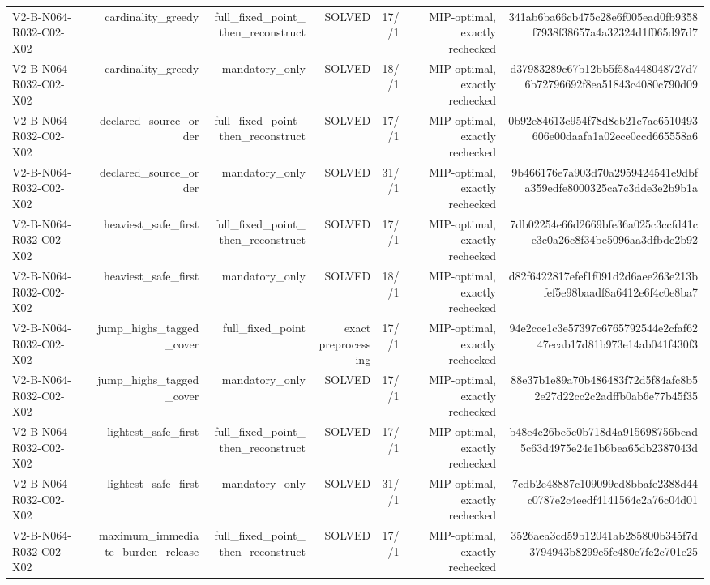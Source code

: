 {\begin{longtable}{lrrrrrr}
V2-B-N064-R032-C02-X02 & cardinality\_greedy & full\_fixed\_point\_then\_reconstruct & SOLVED & 17//1 & MIP-optimal, exactly rechecked & 341ab6ba66cb475c28e6f005ead0fb9358f7938f38657a4a32324d1f065d97d7 \\
V2-B-N064-R032-C02-X02 & cardinality\_greedy & mandatory\_only & SOLVED & 18//1 & MIP-optimal, exactly rechecked & d37983289c67b12bb5f58a448048727d76b72796692f8ea51843c4080c790d09 \\
V2-B-N064-R032-C02-X02 & declared\_source\_order & full\_fixed\_point\_then\_reconstruct & SOLVED & 17//1 & MIP-optimal, exactly rechecked & 0b92e84613c954f78d8cb21c7ae6510493606e00daafa1a02ece0ccd665558a6 \\
V2-B-N064-R032-C02-X02 & declared\_source\_order & mandatory\_only & SOLVED & 31//1 & MIP-optimal, exactly rechecked & 9b466176e7a903d70a2959424541e9dbfa359edfe8000325ca7c3dde3e2b9b1a \\
V2-B-N064-R032-C02-X02 & heaviest\_safe\_first & full\_fixed\_point\_then\_reconstruct & SOLVED & 17//1 & MIP-optimal, exactly rechecked & 7db02254e66d2669bfe36a025c3ccfd41ce3c0a26c8f34be5096aa3dfbde2b92 \\
V2-B-N064-R032-C02-X02 & heaviest\_safe\_first & mandatory\_only & SOLVED & 18//1 & MIP-optimal, exactly rechecked & d82f6422817efef1f091d2d6aee263e213bfef5e98baadf8a6412e6f4c0e8ba7 \\
V2-B-N064-R032-C02-X02 & jump\_highs\_tagged\_cover & full\_fixed\_point & exact preprocessing & 17//1 & MIP-optimal, exactly rechecked & 94e2cce1c3e57397c6765792544e2cfaf6247ecab17d81b973e14ab041f430f3 \\
V2-B-N064-R032-C02-X02 & jump\_highs\_tagged\_cover & mandatory\_only & SOLVED & 17//1 & MIP-optimal, exactly rechecked & 88e37b1e89a70b486483f72d5f84afc8b52e27d22cc2c2adffb0ab6e77b45f35 \\
V2-B-N064-R032-C02-X02 & lightest\_safe\_first & full\_fixed\_point\_then\_reconstruct & SOLVED & 17//1 & MIP-optimal, exactly rechecked & b48e4c26be5c0b718d4a915698756bead5c63d4975e24e1b6bea65db2387043d \\
V2-B-N064-R032-C02-X02 & lightest\_safe\_first & mandatory\_only & SOLVED & 31//1 & MIP-optimal, exactly rechecked & 7cdb2e48887c109099ed8bbafe2388d44c0787e2c4eedf4141564c2a76c04d01 \\
V2-B-N064-R032-C02-X02 & maximum\_immediate\_burden\_release & full\_fixed\_point\_then\_reconstruct & SOLVED & 17//1 & MIP-optimal, exactly rechecked & 3526aea3cd59b12041ab285800b345f7d3794943b8299e5fc480e7fe2c701e25 \\

\end{longtable}}
